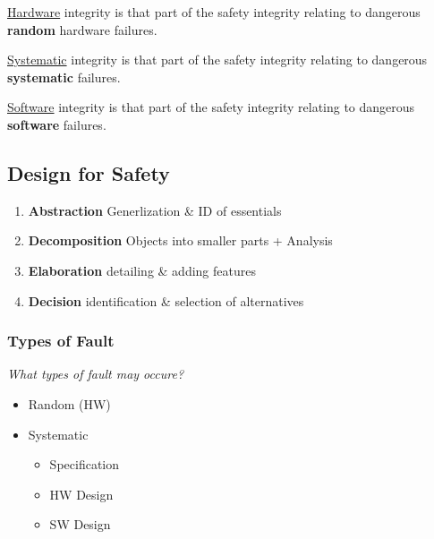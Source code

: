 \documentclass[
  10pt,
  a4paper,
  twocolumn]{article}
\providecommand{\tightlist}{%
  \setlength{\itemsep}{0pt}\setlength{\parskip}{0pt}}\usepackage{longtable,booktabs,array}
\DeclareRobustCommand{\textHighlight}[1]{\tikz[baseline]{\node[anchor=base,fill=Gray!10, rounded corners=5pt, draw, densely dotted] {\bfseries{#1}};}}
\begin{document}
\ul{Hardware} integrity is that part of the safety integrity relating to
dangerous \textbf{random} hardware failures.

\ul{Systematic} integrity is that part of the safety integrity relating
to dangerous \textbf{systematic} failures.

\ul{Software} integrity is that part of the safety integrity relating to
dangerous \textbf{software} failures.

\subsection{Design for Safety}\label{design-for-safety}

\begin{tcolorbox}[enhanced jigsaw, toprule=.15mm, opacityback=0, colbacktitle=quarto-callout-tip-color!10!white, breakable, colframe=quarto-callout-tip-color-frame, title=\textcolor{quarto-callout-tip-color}{\faLightbulb}\hspace{0.5em}{General, \ul{Iterative} Design Process}, left=2mm, arc=.35mm, toptitle=1mm, bottomrule=.15mm, rightrule=.15mm, titlerule=0mm, bottomtitle=1mm, leftrule=.75mm, opacitybacktitle=0.6, coltitle=black, colback=white]

\begin{enumerate}
\def\labelenumi{\arabic{enumi}.}
\tightlist
\item
  \textbf{Abstraction} Generlization \& ID of essentials
\item
  \textbf{Decomposition} Objects into smaller parts + Analysis
\item
  \textbf{Elaboration} detailing \& adding features
\item
  \textbf{Decision} identification \& selection of alternatives
\end{enumerate}

\end{tcolorbox}

\subsubsection{Types of Fault}\label{types-of-fault}

\vspace{-2mm}{\color{Orchid}\faQuestionCircle[regular]} \emph{What types
of fault may occure?}

\textHighlight{\bfseries N{\fontsize{7pt}{8pt}\selectfont{ATURE}}}

\begin{itemize}
\tightlist
\item
  Random (HW)
\item
  Systematic

  \begin{itemize}
  \tightlist
  \item
    Specification
  \item
    HW Design
  \item
    SW Design
  \end{itemize}
\end{itemize}
\end{document}
